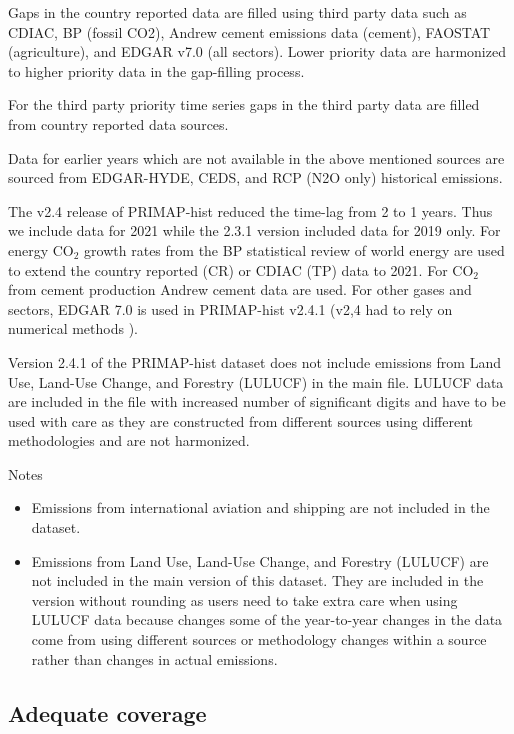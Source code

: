 \documentclass[
  letterpaper,
  DIV=11,
  numbers=noendperiod]{scrartcl}
\providecommand{\tightlist}{%
  \setlength{\itemsep}{0pt}\setlength{\parskip}{0pt}}\usepackage{longtable,booktabs,array}
\begin{document}
Gaps in the country reported data are filled using third party data such
as CDIAC, BP (fossil CO2), Andrew cement emissions data (cement),
FAOSTAT (agriculture), and EDGAR v7.0 (all sectors). Lower priority data
are harmonized to higher priority data in the gap-filling process.

For the third party priority time series gaps in the third party data
are filled from country reported data sources.

Data for earlier years which are not available in the above mentioned
sources are sourced from EDGAR-HYDE, CEDS, and RCP (N2O only) historical
emissions.

The v2.4 release of PRIMAP-hist reduced the time-lag from 2 to 1 years.
Thus we include data for 2021 while the 2.3.1 version included data for
2019 only. For energy CO\(_2\) growth rates from the BP statistical
review of world energy are used to extend the country reported (CR) or
CDIAC (TP) data to 2021. For CO\(_2\) from cement production Andrew
cement data are used. For other gases and sectors, EDGAR 7.0 is used in
PRIMAP-hist v2.4.1 (v2,4 had to rely on numerical methods ).

Version 2.4.1 of the PRIMAP-hist dataset does not include emissions from
Land Use, Land-Use Change, and Forestry (LULUCF) in the main file.
LULUCF data are included in the file with increased number of
significant digits and have to be used with care as they are constructed
from different sources using different methodologies and are not
harmonized.

Notes

\begin{itemize}
\tightlist
\item
  Emissions from international aviation and shipping are not included in
  the dataset.
\item
  Emissions from Land Use, Land-Use Change, and Forestry (LULUCF) are
  not included in the main version of this dataset. They are included in
  the version without rounding as users need to take extra care when
  using LULUCF data because changes some of the year-to-year changes in
  the data come from using different sources or methodology changes
  within a source rather than changes in actual emissions.
\end{itemize}

\hypertarget{adequate-coverage}{%
\subsection{Adequate coverage}\label{adequate-coverage}}
\end{document}
